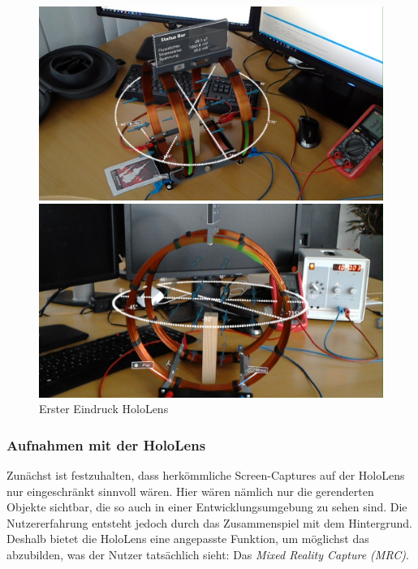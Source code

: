 \begin{figure}[h!]
	\centering
	\includegraphics[width=\textwidth]{images/HL_SS1.jpg}

	\vspace{0.25cm}

	\includegraphics[width=\textwidth]{images/HL_SS2.jpg}
	\caption{Erster Eindruck HoloLens}
	\label{img:HL_SS_Intro}
\end{figure}

\subsubsection{Aufnahmen mit der HoloLens}
Zunächst ist festzuhalten, dass herkömmliche Screen-Captures auf der HoloLens nur eingeschränkt sinnvoll wären. Hier wären nämlich nur die gerenderten Objekte sichtbar, die so auch in einer Entwicklungsumgebung zu sehen sind. Die Nutzererfahrung entsteht jedoch durch das Zusammenspiel mit dem Hintergrund. Deshalb bietet die HoloLens eine angepasste Funktion, um möglichst das abzubilden, was der Nutzer tatsächlich sieht: Das \textit{Mixed Reality Capture (MRC)}.\\

